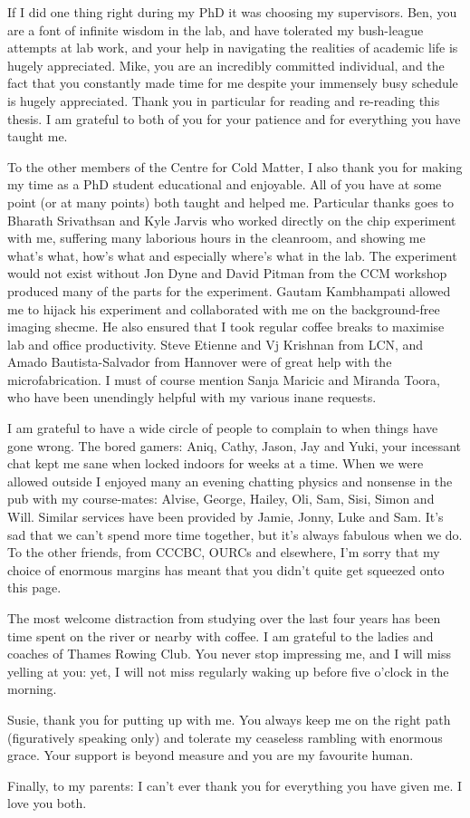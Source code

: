 \begin{singlespace}
If I did one thing right during my PhD it was choosing my supervisors. Ben, you
are a font of infinite wisdom in the lab, and have tolerated my bush-league
attempts at lab work, and your help in navigating the realities of academic
life is hugely appreciated. Mike, you are an incredibly committed individual,
and the fact that you constantly made time for me despite your immensely busy
schedule is hugely appreciated. Thank you in particular for reading and re-reading
this thesis.  I am grateful to both of you for your patience and for
everything you have taught me.

To the other members of the Centre for Cold Matter, I also thank you for making
my time as a PhD student educational and enjoyable. All of you have at some
point (or at many points) both taught and helped me.
%
Particular thanks goes to Bharath Srivathsan and Kyle Jarvis who worked
directly on the chip experiment with me, suffering many laborious hours in the
cleanroom, and showing me what's what, how's what and especially where's what
in the lab.
%
The experiment would not exist without Jon Dyne and David Pitman from the CCM
workshop produced many of the parts for the experiment.
%
Gautam Kambhampati allowed me to hijack his experiment and collaborated with me
on the background-free imaging shecme. He also ensured that I took
regular coffee breaks to maximise lab and office productivity.
%
Steve Etienne and Vj Krishnan from LCN, and Amado Bautista-Salvador from
Hannover were of great help with the microfabrication.
%
I must of course mention Sanja Maricic and Miranda Toora, who have been
unendingly helpful with my various inane requests.

I am grateful to have a wide circle of people to complain to when things have
gone wrong. The bored gamers: Aniq, Cathy, Jason, Jay and Yuki, your incessant
chat kept me sane when locked indoors for weeks at a time. When we were allowed
outside I enjoyed many an evening chatting physics and nonsense in the pub with
my course-mates: Alvise, George, Hailey, Oli, Sam, Sisi, Simon and Will. 
%
Similar services have been provided by Jamie, Jonny, Luke and Sam. It's sad
that we can't spend more time together, but it's always fabulous when we do. To
the other friends, from CCCBC, OURCs and elsewhere, I'm sorry that my choice of
enormous margins has meant that you didn't quite get squeezed onto this page.

The most welcome distraction from studying over the last four years has been
time spent on the river or nearby with coffee. I am grateful to the ladies and
coaches of Thames Rowing Club. You never stop impressing me, and I will miss
yelling at you: yet, I will not miss regularly waking up before five o'clock in the
morning.

Susie, thank you for putting up with me. You always keep me on the right path
(figuratively speaking only) and tolerate my ceaseless rambling with enormous
grace. Your support is beyond measure and you are my favourite human.

Finally, to my parents: I can't ever thank you for everything you have given
me. I love you both.

\end{singlespace}
